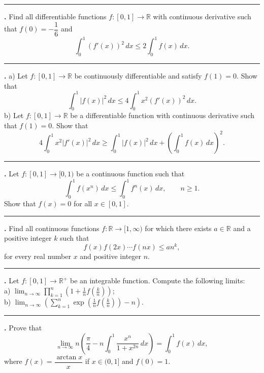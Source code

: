 \documentclass[11pt]{article}
\newcounter{probnum}
\newenvironment{problembox}{\par\noindent\rule{\linewidth}{0.5pt}\vspace{5pt}\par}{\vspace{2pt}}
\begin{document}
\begin{problembox}
\textbf{\theprobnum.} Find all differentiable functions $f : [0,1] \to \mathbb{R}$ with continuous derivative such that $f(0) = -\dfrac{1}{6}$ and
\[
\int_0^1 (f'(x))^2\,dx \le 2 \int_0^1 f(x)\,dx.
\]
\end{problembox}

\begin{problembox}
\textbf{\theprobnum.} a) Let $f : [0,1] \to \mathbb{R}$ be continuously differentiable and satisfy $f(1) = 0$. Show that
\[
\int_0^1 |f(x)|^2\,dx \le 4 \int_0^1 x^2 (f'(x))^2\,dx.
\]
b) Let $f : [0,1] \to \mathbb{R}$ be a differentiable function with continuous derivative such that $f(1) = 0$. Show that
\[
4 \int_0^1 x^2 |f'(x)|^2\,dx \ge \int_0^1 |f(x)|^2\,dx + \left(\int_0^1 f(x)\,dx\right)^2.
\]
\end{problembox}

\begin{problembox}
\textbf{\theprobnum.} Let $f : [0,1] \to [0,1)$ be a continuous function such that
\[
\int_0^1 f(x^n)\,dx \le \int_0^1 f^n(x)\,dx, \qquad n \ge 1.
\]
Show that $f(x) = 0$ for all $x \in [0,1]$.
\end{problembox}

\begin{problembox}
\textbf{\theprobnum.} Find all continuous functions $f : \mathbb{R} \to [1,\infty)$ for which there exists $a \in \mathbb{R}$ and a positive integer $k$ such that
\[
f(x) f(2x) \cdots f(nx) \le a n^k,
\]
for every real number $x$ and positive integer $n$.
\end{problembox}

\begin{problembox}
\textbf{\theprobnum.} Let $f : [0,1] \to \mathbb{R}^+$ be an integrable function. Compute the following limits:\\
a) $\displaystyle\lim_{n \to \infty} \prod_{k=1}^{n} \left(1+\frac{1}{n} f\!\left(\frac{k}{n}\right)\right)$;\\
b) $\displaystyle\lim_{n \to \infty} \left(\sum_{k=1}^{n} \exp\!\left(\frac{1}{n} f\!\left(\frac{k}{n}\right)\right) - n\right)$.
\end{problembox}

\begin{problembox}
\textbf{\theprobnum.} Prove that
\[
\lim_{n \to \infty} n \left(\frac{\pi}{4} - n \int_0^1 \frac{x^n}{1+x^{2n}}\,dx\right) = \int_0^1 f(x)\,dx,
\]
where $f(x) = \dfrac{\arctan x}{x}$ if $x \in (0,1]$ and $f(0) = 1$.
\end{problembox}
\end{document}
